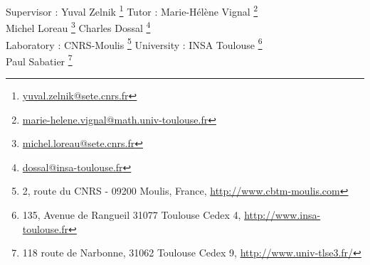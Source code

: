 \documentclass{article}
\begin{document}
\begin{titlepage}


\vspace*{1.9cm}

\begin{flushleft}
Supervisor : Yuval Zelnik \footnote{\url{yuval.zelnik@sete.cnrs.fr}} \hfill
Tutor : Marie-Hélène Vignal \footnote{\url{marie-helene.vignal@math.univ-toulouse.fr}} \\  
Michel Loreau \footnote{\url{michel.loreau@sete.cnrs.fr}} \hfill
Charles Dossal \footnote{\url{dossal@insa-toulouse.fr}} \\
Laboratory : CNRS-Moulis \footnote{2, route du CNRS - 09200 Moulis, France, \url{http://www.cbtm-moulis.com}} \hfill 
University : INSA Toulouse \footnote{135, Avenue de Rangueil 31077 Toulouse Cedex 4, \url{http://www.insa-toulouse.fr}} \\
\hfill Paul Sabatier \footnote{118 route de Narbonne, 31062 Toulouse Cedex 9, \url{http://www.univ-tlse3.fr/}}
\end{flushleft}


\end{titlepage}
\end{document}
